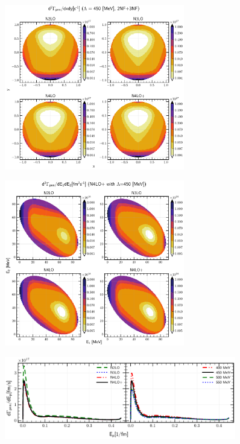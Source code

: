     \begin{figure}[h]
        \begin{center}
        \includegraphics[width=0.7\textwidth]{PlotData/PION/Dalitz_maps/figures/Dalitz_map_pnn_xy_orders.pdf}
        \end{center}
        \caption{}
        \label{pion_map_xy_order}
    \end{figure}

    \begin{figure}[h]
        \begin{center}
        \includegraphics[width=0.7\textwidth]{PlotData/PION/Dalitz_maps/figures/Dalitz_map_pnn_E1E2_orders.pdf}
        \end{center}
        \caption{}
        \label{pion_map_E1E2_order}
    \end{figure}

    \begin{figure}[h]
        \begin{center}
        \includegraphics[width=0.9\textwidth]{PlotData/PION/Dalitz_maps/figures/3HE_dGdEp.pdf}
        \end{center}
        \caption{}
        \label{pion_GdEp}
    \end{figure}

